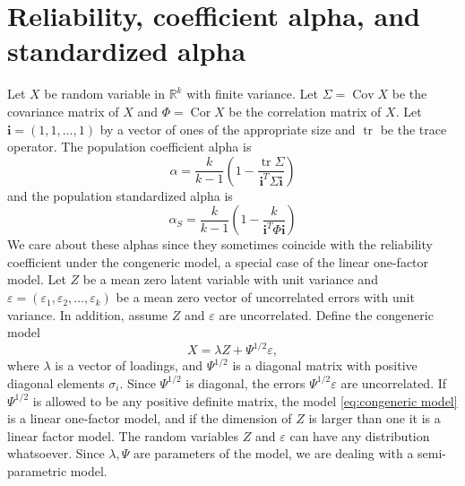 \documentclass[twoside]{article}
\DeclareMathOperator{\tr}{tr}
\DeclareMathOperator{\Cor}{Cor}
\DeclareMathOperator{\Cov}{Cov}
\begin{document}

\section{Reliability, coefficient alpha, and standardized alpha}
\label{sec:coefficienta alpha}

Let $X$ be random variable in $\mathbb{R}^{k}$ with finite variance.
Let $\Sigma=\Cov X$ be the covariance matrix of $X$ and $\Phi=\Cor X$
be the correlation matrix of $X$. Let $\mathbf{i}=(1,1,\ldots,1)$ by a vector of ones of the appropriate size and $\tr$ be the trace operator.
The population coefficient alpha \citep[][eq. 2]{cronbach1951coefficient} is
\begin{equation}
\alpha =  \frac{k}{k-1}\left(1-\frac{\tr\Sigma}{\mathbf{i}^{T}\Sigma\mathbf{i}}\right)\label{eq:Coefficient alpha}
\end{equation}
and the population standardized alpha \citep[][eq. 2]{Falk2011-ae} is
\begin{equation}
\alpha_S=\frac{k}{k-1}\left(1-\frac{k}{\mathbf{i}^{T}\Phi\mathbf{i}}\right)\label{eq:standardized alpha}
\end{equation}
We care about these alphas since they sometimes coincide with the reliability coefficient under the congeneric model, a special case of the linear one-factor model. Let $Z$ be a mean zero latent variable with unit variance and $\varepsilon=(\varepsilon_{1},\varepsilon_{2},\ldots,\varepsilon_{k})$
be a mean zero vector of uncorrelated errors with unit variance. In addition, assume $Z$ and $\varepsilon$ are uncorrelated. Define the congeneric model
\begin{equation}
X=\lambda Z+\Psi^{1/2}\varepsilon,\label{eq:congeneric model}
\end{equation}
where $\lambda$ is a vector of loadings, and $\Psi^{1/2}$ is a diagonal matrix with positive diagonal elements $\sigma_i$. Since $\Psi^{1/2}$ is diagonal, the errors $\Psi^{1/2}\varepsilon$ are uncorrelated. If $\Psi^{1/2}$ is allowed to be any positive definite matrix, the model \eqref{eq:congeneric model} is a linear one-factor model, and if the dimension of $Z$ is larger than one it is a linear factor model. The random variables $Z$ and $\varepsilon$ can have any distribution whatsoever. Since $\lambda,\Psi$ are parameters of the model, we are dealing with a semi-parametric model. 
\end{document}
